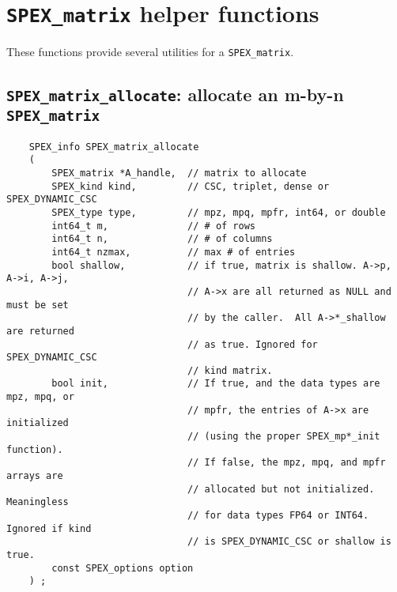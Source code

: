 \documentclass[12pt,oneside]{book}
\theoremstyle{definition}
\begin{document}
\section{\texttt{SPEX\_matrix} helper functions} \label{s:spex_matrix_functions}
These functions provide several utilities for a \verb|SPEX_matrix|.

\subsection{\texttt{SPEX\_matrix\_allocate}: allocate an m-by-n \texttt{SPEX\_matrix}}
\label{s:user:matrix_allocate}
\begin{mdframed}[userdefinedwidth=\textwidth]
{\footnotesize
\begin{verbatim}
    SPEX_info SPEX_matrix_allocate
    (
        SPEX_matrix *A_handle,  // matrix to allocate
        SPEX_kind kind,         // CSC, triplet, dense or SPEX_DYNAMIC_CSC
        SPEX_type type,         // mpz, mpq, mpfr, int64, or double
        int64_t m,              // # of rows
        int64_t n,              // # of columns
        int64_t nzmax,          // max # of entries
        bool shallow,           // if true, matrix is shallow. A->p, A->i, A->j,
                                // A->x are all returned as NULL and must be set
                                // by the caller.  All A->*_shallow are returned
                                // as true. Ignored for SPEX_DYNAMIC_CSC
                                // kind matrix.
        bool init,              // If true, and the data types are mpz, mpq, or
                                // mpfr, the entries of A->x are initialized
                                // (using the proper SPEX_mp*_init function).
                                // If false, the mpz, mpq, and mpfr arrays are
                                // allocated but not initialized. Meaningless
                                // for data types FP64 or INT64. Ignored if kind
                                // is SPEX_DYNAMIC_CSC or shallow is true.
        const SPEX_options option
    ) ;
\end{verbatim}
} \end{mdframed}
\end{document}
